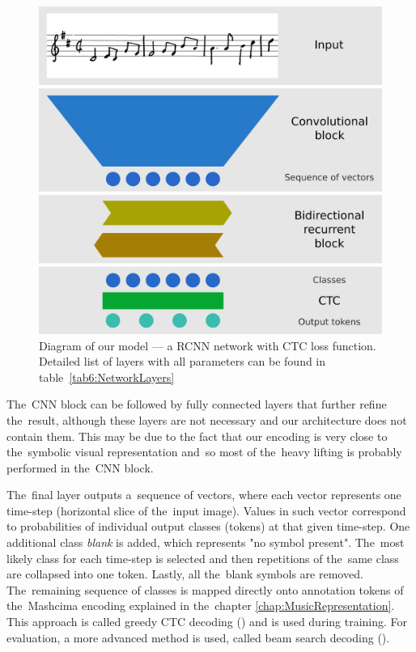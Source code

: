 \begin{figure}[h]
    \centering
    \includegraphics[width=140mm]{../img/network-architecture}
    \caption{Diagram of our model --- a RCNN network with CTC loss function. Detailed list of layers with all parameters can be found in table~\ref{tab6:NetworkLayers}}
    \label{fig3:NetworkArchitecture}
\end{figure}

The~CNN block can be followed by fully connected layers that further refine the~result, although these layers are not necessary and our architecture does not contain them. This may be due to the fact that our encoding is very close to the~symbolic visual representation and~so most of the~heavy lifting is probably performed in the~CNN block.

The~final layer outputs a~sequence of vectors, where each vector represents one time-step (horizontal slice of the~input image). Values in such vector correspond to probabilities of individual output classes (tokens) at that given time-step. One additional class \emph{blank} is added, which represents "no symbol present". The~most likely class for each time-step is selected and then repetitions of the~same class are collapsed into one token. Lastly, all the~blank symbols are removed. The~remaining sequence of classes is mapped directly onto annotation tokens of the~Mashcima encoding explained in the~chapter \ref{chap:MusicRepresentation}. This approach is called greedy CTC decoding (\cite{CTC}) and is used during training. For evaluation, a more advanced method is used, called beam search decoding (\cite{CtcBeamSearch}).

